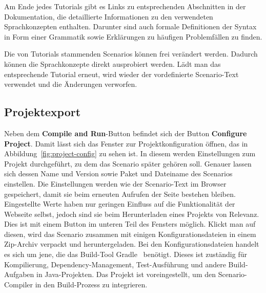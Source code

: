 Am Ende jedes Tutorials gibt es Links zu entsprechenden Abschnitten in der Dokumentation, die detaillierte Informationen zu den verwendeten Sprachkonzepten enthalten.
Darunter sind auch formale Definitionen der Syntax in Form einer Grammatik sowie Erklärungen zu häufigen Problemfällen zu finden.

Die von Tutorials stammenden Scenarios können frei verändert werden.
Dadurch können die Sprachkonzepte direkt ausprobiert werden.
Lädt man das entsprechende Tutorial erneut, wird wieder der vordefinierte Scenario-Text verwendet und die Änderungen verworfen.

\subsection{Projektexport}\label{subsec:project-export}

Neben dem \textbf{Compile and Run}-Button befindet sich der Button \textbf{Configure Project}.
Damit lässt sich das Fenster zur Projektkonfiguration öffnen, das in Abbildung~\ref{fig:project-config} zu sehen ist.
In diesem werden Einstellungen zum Projekt durchgeführt, zu dem das Scenario später gehören soll.
Genauer lassen sich dessen Name und Version sowie Paket und Dateiname des Scenarios einstellen.
Die Einstellungen werden wie der Scenario-Text im Browser gespeichert, damit sie beim erneuten Aufrufen der Seite bestehen bleiben.
Eingestellte Werte haben nur geringen Einfluss auf die Funktionalität der Webseite selbst, jedoch sind sie beim Herunterladen eines Projekts von Relevanz.
Dies ist mit einem Button im unteren Teil des Fensters möglich.
Klickt man auf diesen, wird das Scenario zusammen mit einigen Konfigurationsdateien in einem Zip-Archiv verpackt und heruntergeladen.
Bei den Konfigurationsdateien handelt es sich um jene, die das Build-Tool Gradle~\cite{gradle} benötigt.
Dieses ist zuständig für Kompilierung, Dependency-Management, Test-Ausführung und andere Build-Aufgaben in Java-Projekten.
Das Projekt ist voreingestellt, um den Scenario-Compiler in den Build-Prozess zu integrieren.

